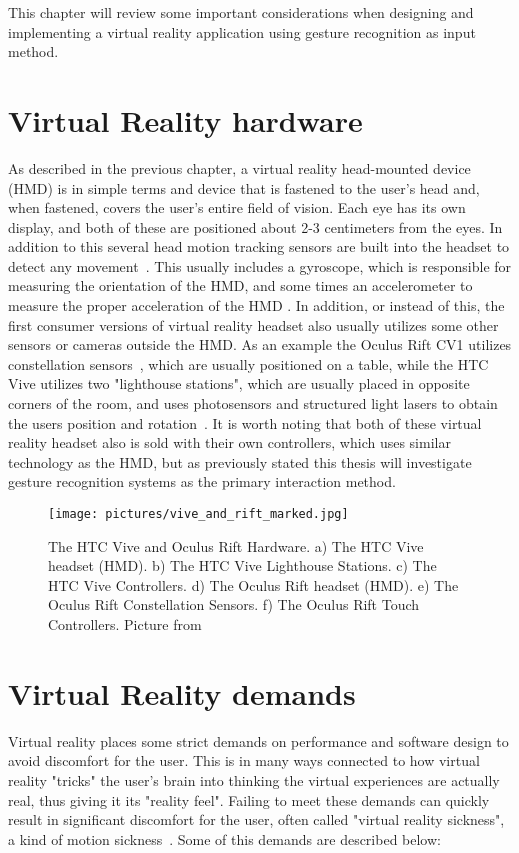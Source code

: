 This chapter will review some important considerations when designing and implementing a virtual reality application using gesture recognition as input method.

\section{Virtual Reality hardware}
As described in the previous chapter, a virtual reality head-mounted device (HMD) is in simple terms and device that is fastened to the user's head and, when fastened, covers the
user's entire field of vision. Each eye has its own display, and both of these are positioned about 2-3 centimeters from the eyes. In addition to this several head motion
tracking sensors are built into the headset to detect any movement~\citep{POLYGON2016}. This usually includes a gyroscope, which is responsible for measuring the orientation of the
HMD, and some times an accelerometer to measure the proper acceleration of the HMD \citep{THEVERGE2016}. In addition, or instead of this, the first consumer versions of 
virtual reality headset also usually utilizes some other sensors or cameras outside the HMD. As an example the Oculus Rift CV1 utilizes constellation sensors~\cite{VRFOCUS2015}, 
which are usually positioned on a table, while the HTC Vive utilizes two "lighthouse stations", which are usually placed in opposite corners of the room, and uses photosensors and 
structured light lasers to obtain the users position and rotation~\cite{GIZMODO2015}. 
It is worth noting that both of these virtual reality headset also is sold with their own controllers, which uses similar technology as the HMD, but as previously stated this
thesis will investigate gesture recognition systems as the primary interaction method.  

\begin{figure}%
	\texttt{[image: pictures/vive\_and\_rift\_marked.jpg]}
	\caption[The HTC Vive and Oculus Rift Hardware]{The HTC Vive and Oculus Rift Hardware. 
    a) The HTC Vive headset (HMD). b) The HTC Vive Lighthouse Stations. c) The HTC Vive Controllers. d) The Oculus Rift headset (HMD). e) The Oculus Rift Constellation Sensors. 
    f) The Oculus Rift Touch Controllers. Picture from \citet{ROADTOVR2016}}
	\label{fig:vive_and_rift_marked}
\end{figure} 

\section{Virtual Reality demands}
Virtual reality places some strict demands on performance and software design to avoid discomfort for the user. This is in many ways connected to how virtual reality "tricks" 
the user's brain into thinking the virtual experiences are actually real, thus giving it its "reality feel". Failing to meet these demands can quickly result in significant 
discomfort for the user, often called "virtual reality sickness", a kind of motion sickness~\citep{ARSTECHNICA2013}. Some of this demands are described below:

